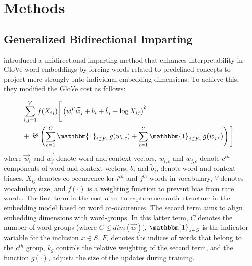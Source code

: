 \documentclass[11pt,a4paper]{article}
\newcommand{\indicator}{\ensuremath{\mathbbm{1}}}
\begin{document}
\section{Methods} \label{sec:methods}


\subsection{Generalized Bidirectional Imparting }
\label{sec:gen_imparting}

\citet{senel20impart} introduced a
unidirectional imparting method   that
enhances interpretability in GloVe word
embeddings by forcing words related to predefined concepts
to project more strongly onto individual embedding
dimensions.
To achieve this, they modified the GloVe cost as follows:

\begin{align}
\begin{split}
	 &\sum_{i,j=1}^{V} f(X_{ij}) \Bigg[ \left(\vec{w}_i^T\vec{\tilde{w}}_j + b_i + \tilde{b}_j -\log{}X_{ij}\right)^2 \\
	      & +\: k^g\left(\sum_{c=1}^{C} \indicator_{i\in{}F_c} \: g(w_{i,c}) + \sum_{c=1}^{C} \indicator_{j \in F_c} \: g(\tilde{w}_{j,c})  \right) \Bigg] 
\end{split}
\label{eq:glove_uni}
\end{align}
where $\vec{w}_i$ and $\vec{\tilde{w}_j}$ denote word and context vectors, $w_{i,c}$ and $\tilde{w}_{j,c}$ denote $c^{th}$ components of word and context vectors, $b_i$ and $\tilde{b}_j$, denote word and context biases, $X_{ij}$ denotes co-occurrence for $i^{th}$ and $j^{th}$ words in vocabulary, $V$ denotes vocabulary size, and $f(\cdot)$ is a weighting function to prevent bias from rare words. The first term in the cost aims to capture semantic structure in the embedding model based on word co-occurences. The second term aims to align embedding dimensions with word-groups. In this latter term, $C$ denotes the number of word-groups (where $C\leq dim(\vec{w})$), $\indicator_{x \in S}$ is the indicator variable for the inclusion ${x \in S}$, $F_c$ denotes the indices of words that belong to the $c^{th}$ group, $k_g$ controls the relative weighting of the second term, and the function $g(\cdot)$, adjusts the size of the updates during training. 
\end{document}

